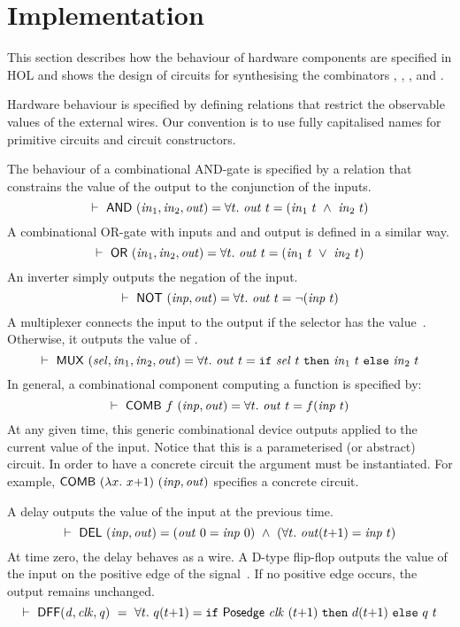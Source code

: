 \section{Implementation}
\label{secImplementation}
This section describes how the behaviour of
hardware components are specified in HOL
and shows the design of circuits for
synthesising the combinators ,
, ,  and .

Hardware behaviour is specified by defining
relations that restrict the observable values of the 
external wires. Our convention is to use fully 
capitalised names for primitive circuits and 
circuit constructors.

The behaviour of a combinational AND-gate
is specified by a relation that constrains the value of the output
to the conjunction of the inputs.
\[
\TURNST\ \DEF{AND}\ (\sVAR{in}{1},\sVAR{in}{2},\VAR{out}) = 
   \forall t.\ \VAR{out}\ t = (\sVAR{in}{1}\ t\ \AND\ \sVAR{in}{2}\ t)
\]
A combinational OR-gate with inputs  and 
and output  is defined in a similar way.
\[
\TURNST\ \DEF{OR}\ (\sVAR{in}{1},\sVAR{in}{2},\VAR{out}) = 
   \forall t.\ \VAR{out}\ t = (\sVAR{in}{1}\ t\ \OR\ \sVAR{in}{2}\ t)
\]
An inverter simply outputs the negation of the input.
\[
\vdash\ \mathsf{NOT}\ (\mathit{inp},\mathit{out}) = 
   \forall t.\ \mathit{out}\ t = \neg(\mathit{inp}\ t)
\]
A multiplexer connects the input 
to the output  if the selector  has the value~.
Otherwise, it outputs the value of .
\[
\TURNST\ \DEF{MUX}\ (\VAR{sel},\sVAR{in}{1},\sVAR{in}{2},\VAR{out}) = 
   \forall t.\ \VAR{out}\ t = \IF{\VAR{sel}\ t}{\sVAR{in}{1}\ t}{\sVAR{in}{2}\ t}
\]
In general, a combinational component computing a function 
is specified by:
\[
\vdash\ \mathsf{COMB}\ f\ \mathit{(inp,out)} = \forall t.\ \mathit{out}\ t = f (\mathit{inp}\ t)
\]
At any given time, this generic combinational device
outputs  applied to the current value
of the input. Notice that this is a parameterised
(or abstract) circuit. In order to have a concrete circuit
the argument  must be instantiated.
For example, $\DEF{COMB}\ (\lambda x.\ x{+}1)\ (\VAR{inp,out})$
specifies a concrete circuit.

A delay outputs the value of the input at the previous time.
\[
\TURNST\ \DEF{DEL}\ (\VAR{inp},\VAR{out}) = 
    (\VAR{out}\ 0 = \VAR{inp}\ 0)\ \AND\ 
    (\forall t.\ \VAR{out} (t{+}1) = \VAR{inp}\ t)
\]
At time zero, the delay behaves as a wire.
A D-type flip-flop  outputs the value of the input  on the
positive edge of the signal~\VAR{clk}.
If no positive edge occurs, the output  remains
unchanged.
\[
\vdash\ \mathsf{DFF} (\mathit{d,clk,q})~ =~
 \forall t.\ q (t{+}1) =  \texttt{if}~\mathsf{Posedge}\ \mathit{clk}\ (t{+}1)~\texttt{then}~d (t{+}1)~\texttt{else}~q\ t
\]

